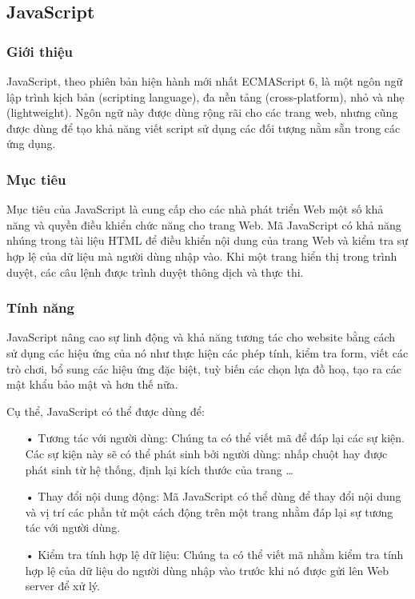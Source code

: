 \documentclass[12pt,a4paper,oneside]{article}
\begin{document}
\subsection{JavaScript}
\subsubsection{Giới thiệu}
JavaScript\citep{jsintro}, theo phiên bản hiện hành mới nhất ECMAScript 6\cite{es6}, là một ngôn ngữ lập trình kịch bản (scripting language), đa nền tảng (cross-platform), nhỏ và nhẹ (lightweight). Ngôn ngữ này được dùng rộng rãi cho các trang web, nhưng cũng được dùng để tạo khả năng viết script sử dụng các đối tượng nằm sẵn trong các ứng dụng.

\subsubsection{Mục tiêu}
Mục tiêu của JavaScript là cung cấp cho các nhà phát triển Web một số khả năng và quyền điều khiển chức năng cho trang Web. Mã JavaScript có khả năng nhúng trong tài liệu HTML để điều khiển nội dung của trang Web và kiểm tra sự hợp lệ của dữ liệu mà người dùng nhập vào. Khi một trang hiển thị trong trình duyệt, các câu lệnh được trình duyệt thông dịch và thực thi.

\subsubsection{Tính năng}
JavaScript nâng cao sự linh động và khả năng tương tác cho website bằng cách sử dụng các hiệu ứng của nó như thực hiện các phép tính, kiểm tra form, viết các trò chơi, bổ sung các hiệu ứng đặc biệt, tuỳ biến các chọn lựa đồ hoạ, tạo ra các mật khẩu bảo mật và hơn thế nữa.

Cụ thể, JavaScript có thể được dùng để:
\begin{itemize}
\item[•] Tương tác với người dùng: Chúng ta có thể viết mã để đáp lại các sự kiện. Các sự kiện này sẽ có thể phát sinh bởi người dùng: nhấp chuột hay được phát sinh từ hệ thống, định lại kích thước của trang …

\item[•] Thay đổi nội dung động: Mã JavaScript có thể dùng để thay đổi nội dung và vị trí các phần tử một cách động trên một trang nhằm đáp lại sự tương tác với người dùng.

\item[•] Kiểm tra tính hợp lệ dữ liệu: Chúng ta có thể viết mã nhằm kiểm tra tính hợp lệ của dữ liệu do người dùng nhập vào trước khi nó được gửi lên Web server để xử lý.
\end{itemize}
\end{document}
